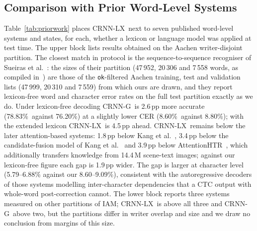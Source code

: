 \documentclass[conference]{IEEEtran}
\newcommand{\ours}{CRNN-LX}            %
\newcommand{\oursnolm}{CRNN-G}         %
\newcommand{\rawwa}{78.83\%}
\newcommand{\rawcer}{8.60\%}
\begin{document}
\subsection{Comparison with Prior Word-Level Systems}
\label{sec:res-prior}

Table~\ref{tab:priorwork} places \ours\ next to seven published
word-level systems and states, for each, whether a lexicon or language
model was applied at test time. The upper block lists results obtained
on the Aachen writer-disjoint partition. The closest match in protocol
is the sequence-to-sequence recogniser of Sueiras et
al.~\cite{sueiras2018offline}: the sizes of their partition
(47\,952, 20\,306 and 7\,558 words, as compiled
in~\cite{mondal2022yolo}) are those of the \texttt{ok}-filtered Aachen
training, test and validation lists (47\,999, 20\,310 and 7\,559) from
which ours are drawn, and they report lexicon-free word and character
error rates on the full test partition exactly as we do. Under
lexicon-free decoding \oursnolm\ is 2.6\,pp more accurate (\rawwa\
against 76.20\%) at a slightly lower CER (\rawcer\ against 8.80\%);
with the extended lexicon \ours\ is 4.5\,pp ahead. \ours\ remains
below the later attention-based systems: 1.8\,pp below Kang et
al.~\cite{kang2018convolve}, 3.4\,pp below the candidate-fusion model
of Kang et al.~\cite{kang2021candidate} and 3.9\,pp below
AttentionHTR~\cite{kass2022attentionhtr}, which additionally transfers
knowledge from 14.4\,M scene-text images; against our lexicon-free
figure each gap is 1.9\,pp wider. The gap is larger at character level
(5.79--6.88\% against our 8.60--9.09\%), consistent with the
autoregressive decoders of those systems modelling inter-character
dependencies that a CTC output with whole-word post-correction cannot.
The lower block reports three systems measured on other partitions of
IAM; \ours\ is above all three and \oursnolm\ above two, but the
partitions differ in writer overlap and size and we draw no conclusion
from margins of this size.
\end{document}
